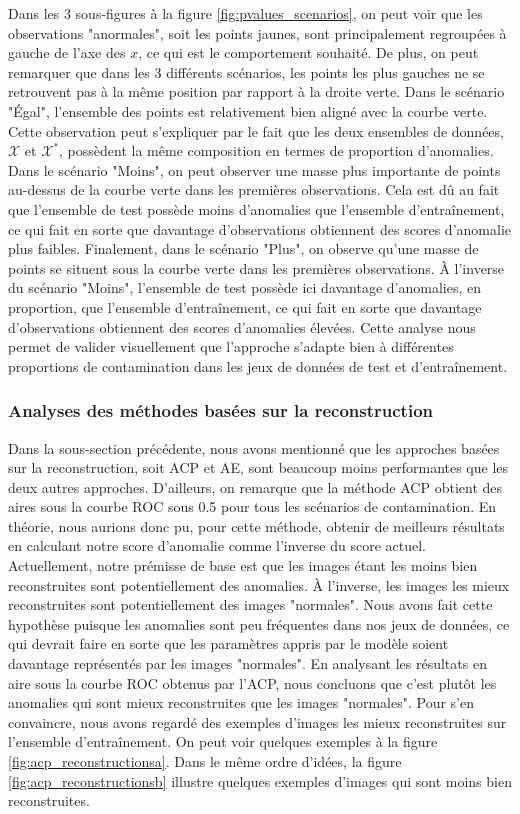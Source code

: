 Dans les 3 sous-figures à la figure \ref{fig:pvalues_scenarios}, on peut voir que les observations "anormales", soit les points jaunes, sont principalement regroupées à gauche de l'axe des $x$, ce qui est le comportement souhaité. De plus, on peut remarquer que dans les 3 différents scénarios, les points les plus gauches ne se retrouvent pas à la même position par rapport à la droite verte. Dans le scénario "Égal", l'ensemble des points est relativement bien aligné avec la courbe verte. Cette observation peut s'expliquer par le fait que les deux ensembles de données, $\mathcal{X}$ et $\mathcal{X^*}$, possèdent la même composition en termes de proportion d'anomalies. Dans le scénario "Moins", on peut observer une masse plus importante de points au-dessus de la courbe verte dans les premières observations. Cela est dû au fait que l'ensemble de test possède moins d'anomalies que l'ensemble d'entraînement, ce qui fait en sorte que davantage d'observations obtiennent des scores d'anomalie plus faibles. Finalement, dans le scénario "Plus", on observe qu'une masse de points se situent sous la courbe verte dans les premières observations. À l'inverse du scénario "Moins", l'ensemble de test possède ici davantage d'anomalies, en proportion, que l'ensemble d'entraînement, ce qui fait en sorte que davantage d'observations obtiennent des scores d'anomalies élevées. Cette analyse nous permet de valider visuellement que l'approche s'adapte bien à différentes proportions de contamination dans les jeux de données de test et d'entraînement.

\subsubsection{Analyses des méthodes basées sur la reconstruction} \label{imagenet:reconsruction}

Dans la sous-section précédente, nous avons mentionné que les approches basées sur la reconstruction, soit ACP et AE, sont beaucoup moins performantes que les deux autres approches. D'ailleurs, on remarque que la méthode ACP obtient des aires sous la courbe ROC sous 0.5 pour tous les scénarios de contamination. En théorie, nous aurions donc pu, pour cette méthode, obtenir de meilleurs résultats en calculant notre score d'anomalie comme l'inverse du score actuel. Actuellement, notre prémisse de base est que les images étant les moins bien reconstruites sont potentiellement des anomalies. À l'inverse, les images les mieux reconstruites sont potentiellement des images "normales". Nous avons fait cette hypothèse puisque les anomalies sont peu fréquentes dans nos jeux de données, ce qui devrait faire en sorte que les paramètres appris par le modèle soient davantage représentés par les images "normales". En analysant les résultats en aire sous la courbe ROC obtenus par l'ACP, nous concluons que c'est plutôt les anomalies qui sont mieux reconstruites que les images "normales". Pour s'en convaincre, nous avons regardé des exemples d'images les mieux reconstruites sur l'ensemble d'entraînement. On peut voir quelques exemples à la figure \ref{fig:acp_reconstructionsa}. Dans le même ordre d'idées, la figure \ref{fig:acp_reconstructionsb} illustre quelques exemples d'images qui sont moins bien reconstruites. 

